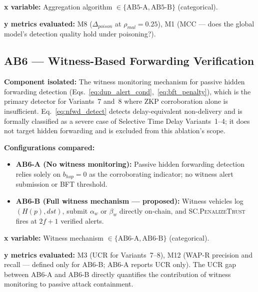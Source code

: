 \documentclass[12pt, a4paper]{report}
\begin{document}
{{\textbf{x variable:} Aggregation algorithm
$\in \{\text{AB5-A}, \text{AB5-B}\}$ (categorical).

\textbf{y metrics evaluated:} M8 ($\Delta_{poison}$
at $\rho_{mal} = 0.25$), M1 (MCC — does the global
model's detection quality hold under poisoning?).


\subsection{AB6 — Witness-Based Forwarding Verification}
\label{sec:ab6}

\textbf{Component isolated:}
The witness monitoring mechanism for passive hidden
forwarding detection
(Eqs.~\ref{eq:dup_alert_cond},~\ref{eq:bft_penalty}),
which is the primary detector for Variants~7 and~8
where \ac{ZKP} corroboration alone is insufficient.
Eq.~\ref{eq:nfwd_detect} detects delay-equivalent
non-delivery and is formally classified as a severe
case of Selective Time Delay Variants~1--4; it does
not target hidden forwarding and is excluded from
this ablation's scope.


\textbf{Configurations compared:}
\begin{itemize}
    \item \textbf{AB6-A (No witness monitoring):}
    Passive hidden forwarding detection relies solely
    on $b_{hop} = 0$ as the corroborating indicator;
    no witness alert submission or BFT threshold.
    \item \textbf{AB6-B (Full witness mechanism —
    proposed):} Witness vehicles log $(H(p), dst)$,
    submit $\alpha_w$ or $\beta_w$ directly on-chain,
    and \textsc{SC.PenalizeTrust} fires at $2f{+}1$
    verified alerts.
\end{itemize}

\textbf{x variable:} Witness mechanism
$\in \{\text{AB6-A}, \text{AB6-B}\}$ (categorical).

\textbf{y metrics evaluated:} M3 (UCR for Variants~7--8),
M12 (WAP-R precision and recall — defined only for
AB6-B; AB6-A reports UCR only). The UCR gap between
AB6-A and AB6-B directly quantifies the contribution
of witness monitoring to passive attack containment.


}}
\end{document}
